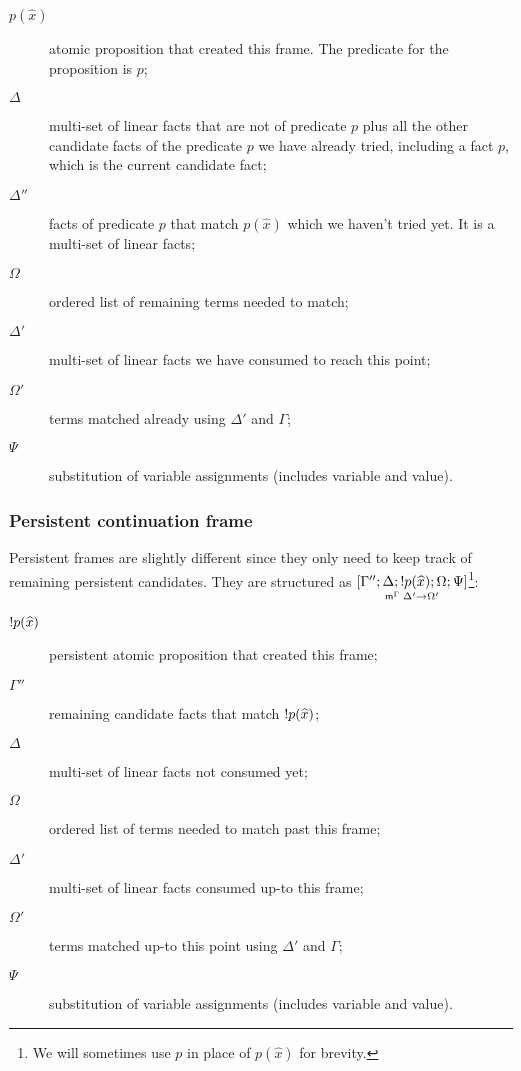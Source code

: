 \begin{description}

   \item[$p(\widehat{x})$] atomic proposition that created this
      frame. The predicate for the proposition is $p$;

   \item[$\Delta$] multi-set of linear facts that are not of predicate $p$ plus
      all the other candidate facts of the predicate $p$ we have already
      tried, including a fact $p$, which is the current candidate fact;

   \item[$\Delta''$] facts of predicate $p$ that match $p(\widehat{x})$ which we
      haven't tried yet. It is a multi-set of linear facts;


   \item[$\Omega$] ordered list of remaining terms needed to match;

   \item[$\Delta'$] multi-set of linear facts we have consumed to reach this point;

   \item[$\Omega'$] terms matched already using $\Delta'$ and $\Gamma$;
   \item[$\Psi$] substitution of variable assignments (includes variable and
      value).
\end{description}

\subsubsection{Persistent continuation frame}

Persistent frames are slightly different since they only need to keep track of
remaining persistent candidates. They are structured as
$\pframe{\Gamma''}{\Delta}{\bang p(\widehat{x})}{\Omega;
\Psi}{\Delta'}{\Omega'}$\footnote{We will sometimes use $p$ in place of
   $p(\widehat{x})$ for brevity.}:

\begin{description}
   \item[$\bang p(\widehat{x})$] persistent atomic proposition that created
      this frame;
   \item[$\Gamma''$] remaining candidate facts that match $\bang p(\widehat{x})$;
   \item[$\Delta$] multi-set of linear facts not consumed yet;

   \item[$\Omega$] ordered list of terms needed to match past this
   frame;

   \item[$\Delta'$] multi-set of linear facts consumed up-to this frame;
   \item[$\Omega'$] terms matched up-to this point using $\Delta'$ and $\Gamma$;
   \item[$\Psi$] substitution of variable assignments (includes variable and value).
\end{description}

